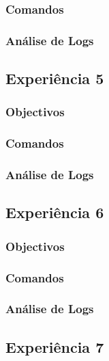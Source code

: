 \documentclass[a4paper,11pt]{article}
\begin{document}
\subsubsection{Comandos}

\subsubsection{Análise de Logs}

\subsection{Experiência 5}
\subsubsection{Objectivos}

\subsubsection{Comandos}

\subsubsection{Análise de Logs}

\subsection{Experiência 6}
\subsubsection{Objectivos}

\subsubsection{Comandos}

\subsubsection{Análise de Logs}

\subsection{Experiência 7}
\end{document}
